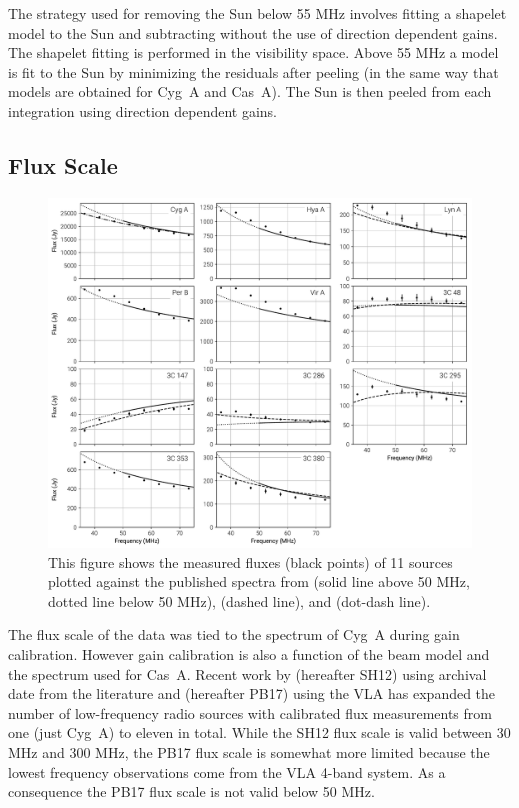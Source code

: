 \documentclass[twocolumn]{aastex61}
\begin{document}
The strategy used for removing the Sun below 55 MHz involves fitting a shapelet
\citep{2003MNRAS.338...35R} model to the Sun and subtracting without the use of direction dependent
gains. The shapelet fitting is performed in the visibility space. Above 55 MHz a model is fit to the
Sun by minimizing the residuals after peeling (in the same way that models are obtained for Cyg~A
and Cas~A). The Sun is then peeled from each integration using direction dependent gains.

\subsection{Flux Scale}

\begin{figure}[t]
    \includegraphics[width=\textwidth]{figures/flux-scale/flux-scale}
    \caption{
        This figure shows the measured fluxes (black points) of 11 sources plotted against the
        published spectra from \citet{2017ApJS..230....7P} (solid line above 50 MHz, dotted line
        below 50 MHz), \citet{2012MNRAS.423L..30S} (dashed line), and \citet{1977A&A....61...99B}
        (dot-dash line).
    }
    \label{fig:flux-scale}
\end{figure}

The flux scale of the data was tied to the \citet{1977A&A....61...99B} spectrum of Cyg~A during gain
calibration. However gain calibration is also a function of the beam model and the spectrum used for
Cas~A. Recent work by \citet{2012MNRAS.423L..30S} (hereafter SH12) using archival date from the
literature and \citet{2017ApJS..230....7P} (hereafter PB17) using the VLA has expanded the number of
low-frequency radio sources with calibrated flux measurements from one (just Cyg~A) to eleven in
total. While the SH12 flux scale is valid between 30 MHz and 300 MHz, the PB17 flux scale is
somewhat more limited because the lowest frequency observations come from the VLA 4-band system. As
a consequence the PB17 flux scale is not valid below 50 MHz.
\end{document}
